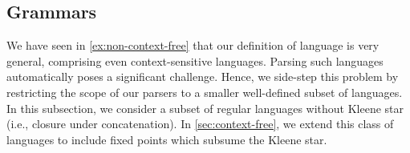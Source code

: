 
\subsection{Grammars}\label{sec:gram-and-parsing}

We have seen in \cref{ex:non-context-free} that our definition of language is very general, comprising even context-sensitive languages. Parsing such languages automatically poses a significant challenge. Hence, we side-step this problem by restricting the scope of our parsers to a smaller well-defined subset of languages. In this subsection, we consider a subset of regular languages without Kleene star (i.e., closure under concatenation). In \cref{sec:context-free}, we extend this class of languages to include fixed points which subsume the Kleene star.

\begin{code}[hide]%
\>[0]\AgdaSpace{}%
\AgdaSpace{}%
\<%
\end{code}
\begin{code}%
\>[0][@{}l@{\AgdaIndent{1}}]%
\>[4]\AgdaSpace{}%
\AgdaSpace{}%
\AgdaSymbol{:}\AgdaSpace{}%
\AgdaSpace{}%
\<%
\\
\>[4][@{}l@{\AgdaIndent{0}}]%
\>[8]\AgdaSpace{}%
\AgdaSymbol{:}\AgdaSpace{}%
\<%
\\
%
\>[8]\AgdaSpace{}%
\AgdaSymbol{:}\AgdaSpace{}%
\<%
\\
%
\>[8]\AgdaSpace{}%
\AgdaSymbol{:}\AgdaSpace{}%
\AgdaSymbol{(}\AgdaSpace{}%
\AgdaSymbol{:}\AgdaSpace{}%
\AgdaSymbol{)}\AgdaSpace{}%
\AgdaSpace{}%
\<%
\\
%
\>[8]\AgdaSpace{}%
\AgdaSymbol{:}\AgdaSpace{}%
\AgdaSymbol{\{}\AgdaSpace{}%
\AgdaSymbol{:}\AgdaSpace{}%
\AgdaSymbol{\}}\AgdaSpace{}%
\AgdaSpace{}%
\AgdaSpace{}%
\AgdaSpace{}%
\AgdaSpace{}%
\AgdaSpace{}%
\AgdaSpace{}%
\<%
\\
%
\>[8]\AgdaSpace{}%
\AgdaSymbol{:}\AgdaSpace{}%
\AgdaSpace{}%
\AgdaSpace{}%
\AgdaSpace{}%
\AgdaSpace{}%
\<%
\\
%
\>[8]\AgdaSpace{}%
\AgdaSymbol{:}\AgdaSpace{}%
\AgdaSpace{}%
\AgdaSpace{}%
\AgdaSpace{}%
\AgdaSpace{}%
\<%
\end{code}

